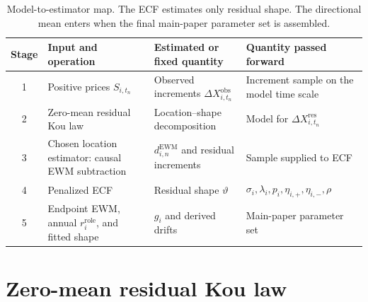 \documentclass[11pt]{article}
\begin{document}
\begin{table}[ht]
\centering
\small
\renewcommand{\arraystretch}{1.08}
\begin{tabularx}{\linewidth}{@{}c>{\raggedright\arraybackslash}X>{\raggedright\arraybackslash}X>{\raggedright\arraybackslash}X@{}}
\toprule
Stage & Input and operation & Estimated or fixed quantity & Quantity passed forward \\
\midrule
1 & Positive prices $S_{i,t_n}$ & Observed increments $\Delta X_{i,t_n}^{\mathrm{obs}}$ & Increment sample on the model time scale \\
2 & Zero-mean residual Kou law & Location--shape decomposition & Model for $\Delta X_{i,t_n}^{\mathrm{res}}$ \\
3 & Chosen location estimator: causal EWM subtraction & $d_{i,n}^{\mathrm{EWM}}$ and residual increments & Sample supplied to ECF \\
4 & Penalized ECF & Residual shape $\vartheta$ & $\sigma_i,\lambda_i,p_i,\eta_{i,+},\eta_{i,-},\rho$ \\
5 & Endpoint EWM, annual $r_i^{\mathrm{role}}$, and fitted shape & $g_i$ and derived drifts & Main-paper parameter set \\
\bottomrule
\end{tabularx}
\caption{Model-to-estimator map. The ECF estimates only residual shape. The directional mean
enters when the final main-paper parameter set is assembled.}
\label{tab:two-stage-map}
\end{table}
\FloatBarrier

\section{Zero-mean residual Kou law}\label{sec:residual-kou-law}
\end{document}
